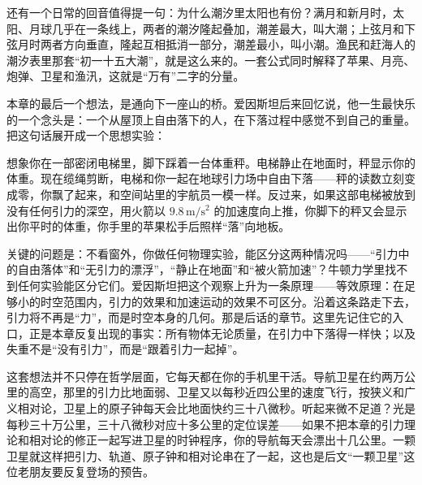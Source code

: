 还有一个日常的回音值得提一句：为什么潮汐里太阳也有份？满月和新月时，太阳、月球几乎在一条线上，两者的潮汐隆起叠加，潮差最大，叫大潮；上弦月和下弦月时两者方向垂直，隆起互相抵消一部分，潮差最小，叫小潮。渔民和赶海人的潮汐表里那套“初一十五大潮”，就是这么来的。一套公式同时解释了苹果、月亮、炮弹、卫星和渔汛，这就是“万有”二字的分量。


本章的最后一个想法，是通向下一座山的桥。爱因斯坦后来回忆说，他一生最快乐的一个念头是：一个从屋顶上自由落下的人，在下落过程中感觉不到自己的重量。把这句话展开成一个思想实验：

\begin{thought}[看不见窗外的电梯]
想象你在一部密闭电梯里，脚下踩着一台体重秤。电梯静止在地面时，秤显示你的体重。现在缆绳剪断，电梯和你一起在地球引力场中自由下落——秤的读数立刻变成零，你飘了起来，和空间站里的宇航员一模一样。反过来，如果这部电梯被放到没有任何引力的深空，用火箭以 \(9.8\,\mathrm{m/s^{2}}\) 的加速度向上推，你脚下的秤又会显示出你平时的体重，你手里的苹果松手后照样“落”向地板。

关键的问题是：不看窗外，你做任何物理实验，能区分这两种情况吗——“引力中的自由落体”和“无引力的漂浮”，“静止在地面”和“被火箭加速”？牛顿力学里找不到任何实验能区分它们。爱因斯坦把这个观察上升为一条原理——等效原理：在足够小的时空范围内，引力的效果和加速运动的效果不可区分。沿着这条路走下去，引力将不再是“力”，而是时空本身的几何。那是后话的章节。这里先记住它的入口，正是本章反复出现的事实：所有物体无论质量，在引力中下落得一样快；以及失重不是“没有引力”，而是“跟着引力一起掉”。
\end{thought}

这套想法并不只停在哲学层面，它每天都在你的手机里干活。导航卫星在约两万公里的高空，那里的引力比地面弱、卫星又以每秒近四公里的速度飞行，按狭义和广义相对论，卫星上的原子钟每天会比地面快约三十八微秒。听起来微不足道？光是每秒三十万公里，三十八微秒对应十多公里的定位误差——如果不把本章的引力理论和相对论的修正一起写进卫星的时钟程序，你的导航每天会漂出十几公里。一颗卫星就这样把引力、轨道、原子钟和相对论串在了一起，这也是后文“一颗卫星”这位老朋友要反复登场的预告。

